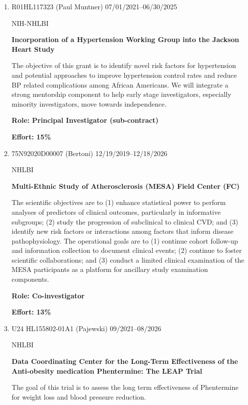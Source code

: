 \documentclass[11pt]{cv_wakeforest_article}
\newcommand{\AR}[1]{#1}  %
\begin{document}
\begin{enumerate}
{\bfseries Role: Co-investigator}

{\bfseries Effort: 10\%}

\item \AR{R01HL117323 (Paul Muntner)} \hfill 07/01/2021--06/30/2025

NIH-NHLBI

{\bfseries Incorporation of a Hypertension Working Group into the Jackson Heart Study}

The objective of this grant is to identify novel risk factors for hypertension and potential approaches to improve hypertension control rates and reduce BP related complications among African Americans. We will integrate a strong mentorship component to help early stage investigators, especially minority investigators, move towards independence.

{\bfseries Role: Principal Investigator (sub-contract)}

{\bfseries Effort: 15\%}

\item \AR{75N92020D00007 (Bertoni)} \hfill 12/19/2019--12/18/2026
  
NHLBI
  
{\bfseries Multi-Ethnic Study of Atherosclerosis (MESA) Field Center (FC)}

The scientific objectives are to (1) enhance statistical power to perform analyses of predictors of clinical outcomes, particularly in informative subgroups; (2) study the progression of subclinical to clinical CVD; and (3) identify new risk factors or interactions among factors that inform disease pathophysiology. The operational goals are to (1) continue cohort follow-up and information collection to document clinical events; (2) continue to foster scientific collaborations; and (3) conduct a limited clinical examination of the MESA participants as a platform for ancillary study examination components. 

{\bfseries Role: Co-investigator}

{\bfseries Effort: 13\%}

\item U24 HL155802-01A1 (Pajewski) \hfill 09/2021--08/2026

NHLBI

{\bfseries Data Coordinating Center for the Long-Term Effectiveness of the Anti-obesity medication Phentermine: The LEAP Trial}

The goal of this trial is to assess the long term effectiveness of Phentermine for weight loss and blood pressure reduction.


\end{enumerate}
\end{document}
